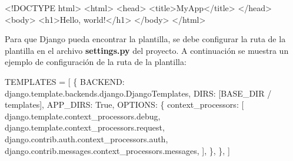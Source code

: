 \documentclass[
  a4paper,
  DIV=11,
  numbers=noendperiod,
  onepage,
  openany]{scrreprt}
\newenvironment{Shaded}{\begin{snugshade}}{\end{snugshade}}
\newcommand{\DataTypeTok}[1]{\textcolor[rgb]{0.68,0.00,0.00}{#1}}
\newcommand{\KeywordTok}[1]{\textcolor[rgb]{0.00,0.23,0.31}{#1}}
\newcommand{\NormalTok}[1]{\textcolor[rgb]{0.00,0.23,0.31}{#1}}
\newcommand{\OperatorTok}[1]{\textcolor[rgb]{0.37,0.37,0.37}{#1}}
\newcommand{\StringTok}[1]{\textcolor[rgb]{0.13,0.47,0.30}{#1}}
\newcommand{\VariableTok}[1]{\textcolor[rgb]{0.07,0.07,0.07}{#1}}
\newcommand*\circled[1]{\tikz[baseline=(char.base)]{
          \node[shape=circle,draw,inner sep=1pt] (char) {{\scriptsize#1}};}}
\begin{document}
\begin{Shaded}
\begin{Highlighting}[]
\DataTypeTok{\textless{}!DOCTYPE }\NormalTok{html}\DataTypeTok{\textgreater{}}
\DataTypeTok{\textless{}}\KeywordTok{html}\DataTypeTok{\textgreater{}}
\DataTypeTok{\textless{}}\KeywordTok{head}\DataTypeTok{\textgreater{}}
    \DataTypeTok{\textless{}}\KeywordTok{title}\DataTypeTok{\textgreater{}}\NormalTok{MyApp}\DataTypeTok{\textless{}/}\KeywordTok{title}\DataTypeTok{\textgreater{}}
\DataTypeTok{\textless{}/}\KeywordTok{head}\DataTypeTok{\textgreater{}}
\DataTypeTok{\textless{}}\KeywordTok{body}\DataTypeTok{\textgreater{}}
    \DataTypeTok{\textless{}}\KeywordTok{h1}\DataTypeTok{\textgreater{}}\NormalTok{Hello, world!}\DataTypeTok{\textless{}/}\KeywordTok{h1}\DataTypeTok{\textgreater{}}
\DataTypeTok{\textless{}/}\KeywordTok{body}\DataTypeTok{\textgreater{}}
\DataTypeTok{\textless{}/}\KeywordTok{html}\DataTypeTok{\textgreater{}}
\end{Highlighting}
\end{Shaded}

Para que Django pueda encontrar la plantilla, se debe configurar la ruta
de la plantilla en el archivo \textbf{settings.py} del proyecto. A
continuación se muestra un ejemplo de configuración de la ruta de la
plantilla:

\label{annotated-cell-389}%
\begin{Shaded}
\begin{Highlighting}[]

\NormalTok{TEMPLATES }\OperatorTok{=}\NormalTok{ [}
\NormalTok{    \{}
        \StringTok{\textquotesingle{}BACKEND\textquotesingle{}}\NormalTok{: }\StringTok{\textquotesingle{}django.template.backends.django.DjangoTemplates\textquotesingle{}}\NormalTok{,}
        \StringTok{\textquotesingle{}DIRS\textquotesingle{}}\NormalTok{: [BASE\_DIR }\OperatorTok{/} \StringTok{\textquotesingle{}templates\textquotesingle{}}\NormalTok{], }\hspace*{\fill}\NormalTok{\circled{1}}
        \StringTok{\textquotesingle{}APP\_DIRS\textquotesingle{}}\NormalTok{: }\VariableTok{True}\NormalTok{,}
        \StringTok{\textquotesingle{}OPTIONS\textquotesingle{}}\NormalTok{: \{}
            \StringTok{\textquotesingle{}context\_processors\textquotesingle{}}\NormalTok{: [}
                \StringTok{\textquotesingle{}django.template.context\_processors.debug\textquotesingle{}}\NormalTok{,}
                \StringTok{\textquotesingle{}django.template.context\_processors.request\textquotesingle{}}\NormalTok{,}
                \StringTok{\textquotesingle{}django.contrib.auth.context\_processors.auth\textquotesingle{}}\NormalTok{,}
                \StringTok{\textquotesingle{}django.contrib.messages.context\_processors.messages\textquotesingle{}}\NormalTok{,}
\NormalTok{            ],}
\NormalTok{        \},}
\NormalTok{    \},}
\NormalTok{]}
\end{Highlighting}
\end{Shaded}
\end{document}
